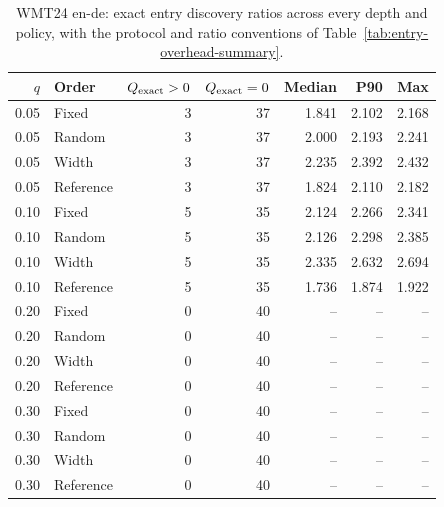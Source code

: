\begin{table}[t]
\centering\small


\begin{tabular}{rlrrrrr}
\toprule
$q$ & Order & $Q_{\rm exact}>0$ & $Q_{\rm exact}=0$ & Median & P90 & Max \\
\midrule
0.05 & Fixed & 3 & 37 & 1.841 & 2.102 & 2.168 \\
0.05 & Random & 3 & 37 & 2.000 & 2.193 & 2.241 \\
0.05 & Width & 3 & 37 & 2.235 & 2.392 & 2.432 \\
0.05 & Reference & 3 & 37 & 1.824 & 2.110 & 2.182 \\
0.10 & Fixed & 5 & 35 & 2.124 & 2.266 & 2.341 \\
0.10 & Random & 5 & 35 & 2.126 & 2.298 & 2.385 \\
0.10 & Width & 5 & 35 & 2.335 & 2.632 & 2.694 \\
0.10 & Reference & 5 & 35 & 1.736 & 1.874 & 1.922 \\
0.20 & Fixed & 0 & 40 & -- & -- & -- \\
0.20 & Random & 0 & 40 & -- & -- & -- \\
0.20 & Width & 0 & 40 & -- & -- & -- \\
0.20 & Reference & 0 & 40 & -- & -- & -- \\
0.30 & Fixed & 0 & 40 & -- & -- & -- \\
0.30 & Random & 0 & 40 & -- & -- & -- \\
0.30 & Width & 0 & 40 & -- & -- & -- \\
0.30 & Reference & 0 & 40 & -- & -- & -- \\
\bottomrule
\end{tabular}
\caption{WMT24 en-de: exact entry discovery ratios across every depth and policy, with the protocol and ratio conventions of Table~\ref{tab:entry-overhead-summary}.}
\label{tab:entry-overhead-all-3}
\end{table}
